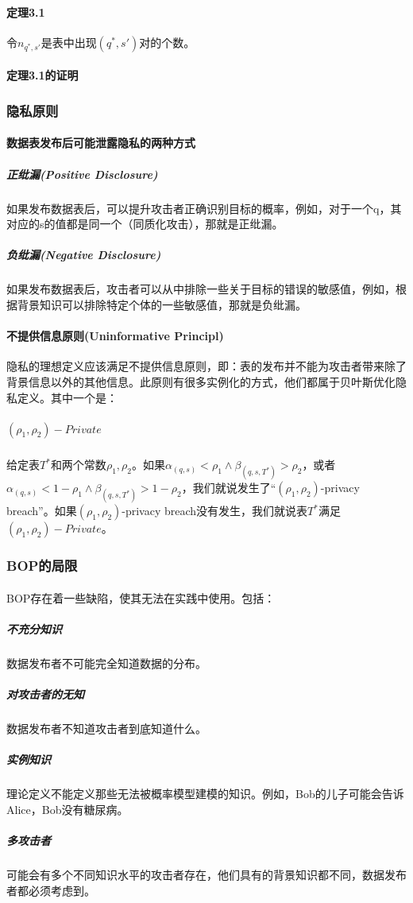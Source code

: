 \documentclass[12pt,a4paper]{article}
\begin{document}
\paragraph{定理3.1} 令$n_{q^*,s'}$是表中出现$(q^*, s')$对的个数。

\paragraph{定理3.1的证明}

\subsubsection{隐私原则}
\paragraph{数据表发布后可能泄露隐私的两种方式}
	\subparagraph{正纰漏(Positive Disclosure)} 如果发布数据表后，可以提升攻击者正确识别目标的概率，例如，对于一个q，其对应的s的值都是同一个（同质化攻击），那就是正纰漏。 
	\subparagraph{负纰漏(Negative Disclosure)} 如果发布数据表后，攻击者可以从中排除一些关于目标的错误的敏感值，例如，根据背景知识可以排除特定个体的一些敏感值，那就是负纰漏。
\paragraph{不提供信息原则(Uninformative Principl)} 隐私的理想定义应该满足不提供信息原则，即：表的发布并不能为攻击者带来除了背景信息以外的其他信息。此原则有很多实例化的方式，他们都属于贝叶斯优化隐私定义。其中一个是：
	\subparagraph{$(\rho_1, \rho_2)-Private$} 给定表$T^*$和两个常数$\rho_1,\rho_2$。如果$\alpha_{(q,s)} < \rho_1 \wedge \beta_{(q,s,T^*)} > \rho_2$，或者$\alpha_{(q,s)} < 1 - \rho_1 \wedge \beta_{(q,s,T^*)} > 1 - \rho_2$，我们就说发生了“$(\rho_1, \rho_2)$-privacy breach”。如果$(\rho_1, \rho_2)$-privacy breach没有发生，我们就说表$T^*$满足$(\rho_1, \rho_2)-Private$。

\subsubsection{BOP的局限}
	
\paragraph{} BOP存在着一些缺陷，使其无法在实践中使用。包括：
	\subparagraph{不充分知识} 数据发布者不可能完全知道数据的分布。
	\subparagraph{对攻击者的无知} 数据发布者不知道攻击者到底知道什么。
	\subparagraph{实例知识} 理论定义不能定义那些无法被概率模型建模的知识。例如，Bob的儿子可能会告诉Alice，Bob没有糖尿病。
	\subparagraph{多攻击者} 可能会有多个不同知识水平的攻击者存在，他们具有的背景知识都不同，数据发布者都必须考虑到。
	
\end{document}
